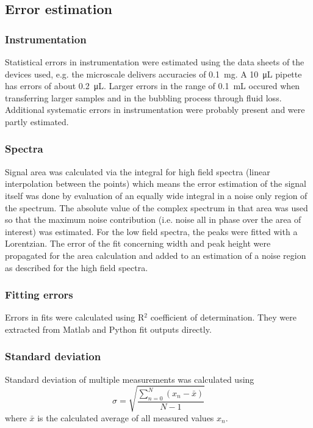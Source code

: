     \subsection{Error estimation}
        \subsubsection{Instrumentation}
            Statistical errors in instrumentation were estimated using the data sheets of the devices used, e.g. the microscale delivers accuracies of \SI{0.1}{\milli\gram}. A \SI{10}{\micro\liter} pipette has errors of about \SI{0.2}{\micro\liter}. Larger errors in the range of \SI{0.1}{\milli\liter} occured when transferring larger samples and in the bubbling process through fluid loss. Additional systematic errors in instrumentation were probably present and were partly estimated.
        \subsubsection{Spectra}
        Signal area was calculated via the integral for high field spectra (linear interpolation between the points) which means the error estimation of the signal itself was done by evaluation of an equally wide integral in a noise only region of the spectrum. The absolute value of the complex spectrum in that area was used so that the maximum noise contribution (i.e. noise all in phase over the area of interest) was estimated.
            For the low field spectra, the peaks were fitted with a Lorentzian. The error of the fit concerning width and peak height were propagated for the area calculation and added to an estimation of a noise region as described for the high field spectra.
        \subsubsection{Fitting errors}
        Errors in fits were calculated using R$^2$ coefficient of determination. They were extracted from Matlab and Python fit outputs directly.
        \subsubsection{Standard deviation}
            Standard deviation of multiple measurements was calculated using
            \begin{equation}
                \sigma=\sqrt{\frac{\sum_{n=0}^N( x_n - \bar x)}{N-1}}
            \end{equation}
            where $\bar x$ is the calculated average of all measured values $x_n$.
